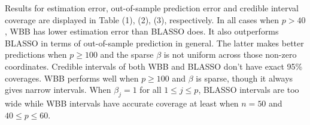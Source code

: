 \documentclass[12pt]{TD-CJS}
\begin{document}
\renewcommand{\arraystretch}{0.5}
\begin{table}[ht]\label{beta-mse}
\end{table}	

Results for estimation error,  out-of-sample prediction error  and credible interval coverage are displayed in Table (1), (2), (3), respectively. In all cases when $p>40$, WBB has lower estimation error than BLASSO does. It also outperforms BLASSO in terms of out-of-sample prediction in general. The latter makes better predictions when $p\geq 100$ and the sparse $\beta$ is not uniform across those non-zero coordinates. Credible intervals of both WBB and BLASSO don't have exact 95\% coverages.  WBB performs well when $p \geq 100$ and $\beta$ is sparse, though it always gives narrow intervals.  When $\beta_j = 1$ for all $1 \leq j \leq p$, BLASSO intervals are too wide while WBB intervals have accurate coverage at least when $n = 50$ and $40 \leq p \leq 60$.
\end{document}
